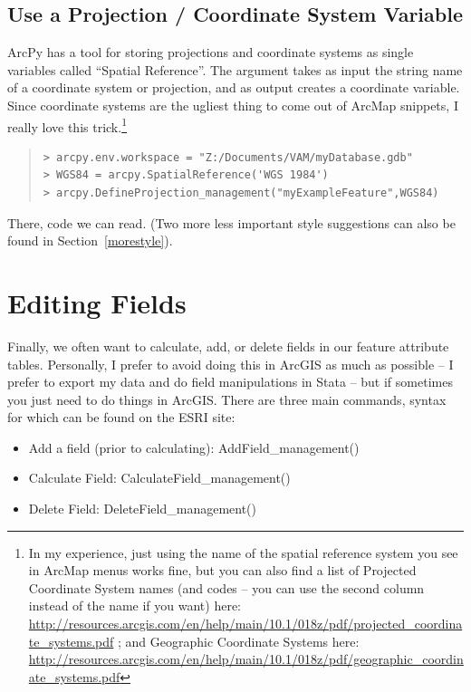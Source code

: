\documentclass[12pt]{article}
\begin{document}
\subsection*{\textbf{Use a Projection / Coordinate System Variable}}
ArcPy has a tool for storing projections and coordinate systems as single variables called ``Spatial Reference''. The argument takes as input the string name of a coordinate system or projection, and as output creates a coordinate variable.  Since coordinate systems are the ugliest thing to come out of ArcMap snippets, I really love this trick.\footnote{In my experience, just using the name of the spatial reference system you see in ArcMap menus works fine, but you can also find a list of Projected Coordinate System names (and codes -- you can use the second column instead of the name if you want) here: \url{http://resources.arcgis.com/en/help/main/10.1/018z/pdf/projected_coordinate_systems.pdf} ; and Geographic Coordinate Systems here: \url{http://resources.arcgis.com/en/help/main/10.1/018z/pdf/geographic_coordinate_systems.pdf} }	

\begin{quote}
\begin{verbatim}
> arcpy.env.workspace = "Z:/Documents/VAM/myDatabase.gdb"	
> WGS84 = arcpy.SpatialReference('WGS 1984')
> arcpy.DefineProjection_management("myExampleFeature",WGS84)
\end{verbatim}
\end{quote}
There, code we can read. (Two more less important style suggestions can also be found in Section~\ref{morestyle}). 


\section{Editing Fields}
Finally, we often want to calculate, add, or delete fields in our feature attribute tables. Personally, I prefer to avoid doing this in ArcGIS as much as possible -- I prefer to export my data and do field manipulations in Stata -- but if sometimes you just need to do things in ArcGIS. There are three main commands, syntax for which can be found on the ESRI site:
\begin{itemize}
	\item Add a field (prior to calculating): AddField\_management()
	\item Calculate Field: CalculateField\_management()
	\item Delete Field: DeleteField\_management()
\end{itemize}
\end{document}
